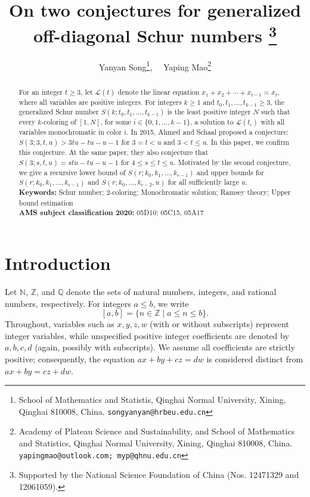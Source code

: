 \documentclass[twoside, 12pt]{article}
\begin{document}
\title{\textbf{On two conjectures for generalized off-diagonal Schur numbers}
\footnote{Supported by the National Science Foundation of China
(Nos. 12471329 and 12061059).}
}
\author{Yanyan Song\footnote{School of Mathematics and Statistis, Qinghai Normal University, Xining, Qinghai 810008, China. {\tt songyanyan@hrbeu.edu.cn}}, \ \ Yaping Mao\footnote{Academy of Plateau
Science and Sustainability, and School of Mathematics and Statistics, Qinghai Normal University, Xining, Qinghai 810008, China. {\tt yapingmao@outlook.com; myp@qhnu.edu.cn}}
}

\date{}
\maketitle
\begin{abstract}
For an integer $t \geq 3$, let $\mathcal{L}(t)$ denote the linear equation
$x_1 + x_2 + \cdots + x_{t-1} = x_t,$
where all variables are positive integers. For integers $k \geq 1$ and $t_0,t_1,\dots,t_{k-1} \geq 3$, the generalized Schur number $S(k;t_0,t_1,\dots,t_{k-1})$ is the least positive integer $N$ such that every $k$-coloring of $[1,N]$, for some $i \in \{0,1,\dots,k-1\}$, a solution to $\mathcal{L}(t_i)$ with all variables monochromatic in color $i$.
In 2015,
Ahmed and Schaal proposed a conjecture:
$S(3 ; 3, t, u)>3 t u-t u-u-1$ for $3=t<u$ and $3<t \leq u$. In this paper, we confirm this conjecture. At the same paper, they also conjecture that
$S(3 ; s, t, u)=s t u-t u-u-1$ for $4 \leq s \leq t \leq u$. Motivated by the second conjecture, we give a recursive lower bound of
$S(r; k_0, k_1, \dots, k_{r-1})$ and upper bounds for $S(r; k_0, k_1, \dots, k_{r-1})$ and $S(r;k_0,\dots,k_{r-2},u)$ for all sufficiently large $u$.
\\[2mm]
{\bf Keywords:} Schur number; 2-coloring; Monochromatic solution; Ramsey theory; Upper bound estimation\\[2mm]
{\bf AMS subject classification 2020:} 05D10; 05C15, 05A17
\end{abstract}




\section{Introduction}

Let $\mathbb{N}$, $\mathbb{Z}$, and $\mathbb{Q}$ denote the sets of natural numbers, integers, and rational numbers, respectively. For integers $a \leq b$, we write
\[
[a,b] = \{n \in \mathbb{Z} \mid a \leq n \leq b\}.
\]
Throughout, variables such as $x,y,z,w$ (with or without subscripts) represent integer variables, while unspecified positive integer coefficients are denoted by $a,b,c,d$ (again, possibly with subscripts). We assume all coefficients are strictly positive; consequently, the equation $ax+by+cz=dw$ is considered distinct from
$ax+by=cz+dw.$
\end{document}
